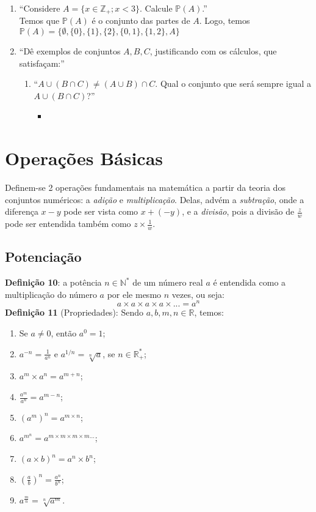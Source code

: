 \documentclass{article}
\begin{document}
\begin{enumerate}
\begin{enumerate}
\begin{itemize}
        \end{itemize}
    \end{enumerate}
    \item \enquote{Considere $A = \{ x \in \mathbb{Z}_+ ; x < 3 \}$. Calcule $\mathbb{P}(A)$.} \\
    Temos que $\mathbb{P}(A)$ é o conjunto das partes de $A$. Logo, temos $\mathbb{P}(A) = \{\emptyset, \{0\}, \{1\}, \{2\}, \{0, 1\}, \{1, 2\}, A \}$
    \item \enquote{Dê exemplos de conjuntos $A, B, C$, justificando com os cálculos, que satisfaçam:}
    \begin{enumerate}
        \item \enquote{$A \cup (B \cap C) \ne (A \cup B) \cap C$. Qual o conjunto que será sempre igual a $A \cup (B \cap C)$?}
        \begin{itemize}
            \item 
        \end{itemize}
    \end{enumerate}
\end{enumerate}

\section{Operações Básicas}
Definem-se 2 operações fundamentais na matemática a partir da teoria dos conjuntos numéricos: a \emph{adição} e \emph{multiplicação}. Delas, advém a \emph{subtração}, onde a diferença $x - y$ pode ser vista como $x + (-y)$, e a \emph{divisão}, pois a divisão de $\frac{z}{w}$ pode ser entendida também como $z \times \frac{1}{w}$.
\subsection{Potenciação}
\textbf{Definição 10}: a potência $n \in \mathbb{N}^*$ de um número real $a$ é entendida como a multiplicação do número $a$ por ele mesmo $n$ vezes, ou seja:
\begin{displaymath}
    a \times a \times a \times a \times ... = a^n
\end{displaymath}
\textbf{Definição 11} (Propriedades): Sendo $a, b, m, n \in \mathbb{R}$, temos:
\begin{enumerate}
    \item Se $a \ne 0$, então $a^0 = 1$;
    \item $a^{-n} = \frac{1}{a^n}$ e $a^{1/n} = \sqrt[n]{a}$, se $n \in \mathbb{R}^*_+$;
    \item $a^m \times a^n = a^{m+n}$;
    \item $\frac{a^m}{a^n} = a^{m-n}$;
    \item $(a^m)^n = a^{m \times n}$;
    \item $a^{m^n} = a^{m \times m \times m \times m ...}$;
    \item $(a \times b)^n = a^n \times b^n$;
    \item $(\frac{a}{b})^n = \frac{a^n}{b^n}$;
    \item $a^{\frac{m}{n}} = \sqrt[n]{a^m}$.
\end{enumerate}
\end{document}

